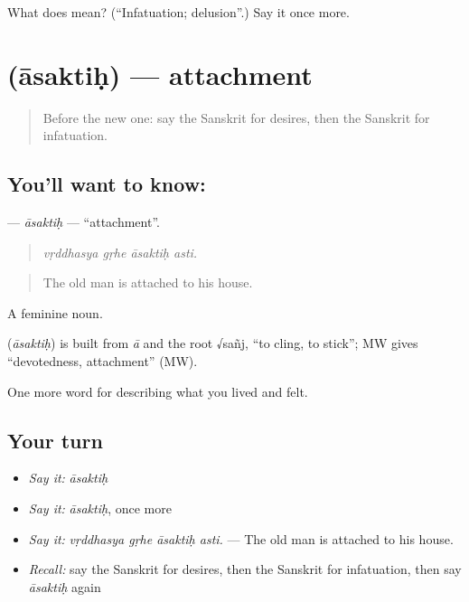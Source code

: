\begin{tcolorbox}[breakable,colback=teal!4,colframe=teal!35!black,title={Before you move on}]
What does  mean? (\textquotedblleft{}Infatuation; delusion\textquotedblright{}.) Say it once more.
\end{tcolorbox}
\section[\texorpdfstring{\sk{आसक्तिः} (āsaktiḥ)}{आसक्तिः (āsaktiḥ)}]{ (āsaktiḥ) — attachment}

\label{lesson:SA-C455-asaktih}



\begin{quote}
Before the new one: say the Sanskrit for desires, then the Sanskrit for infatuation.
\end{quote}

\subsection*{You'll want to know: }
\textbf{} — \emph{āsaktiḥ} — \textquotedblleft{}attachment\textquotedblright{}.

\begin{quote}
   
\end{quote}

\begin{quote}
\emph{vṛddhasya gṛhe āsaktiḥ asti.}
\end{quote}

\begin{quote}
The old man is attached to his house.
\end{quote}

A feminine noun.

\begin{cousinweb}
\textbf{} (\emph{āsaktiḥ}) is built from \emph{ā} and the root √sañj, \textquotedblleft{}to cling, to stick\textquotedblright{}; MW gives \textquotedblleft{}devotedness, attachment\textquotedblright{} (MW).
\end{cousinweb}

\begin{grammarlens}[title={What you've built}]
One more word for describing what you lived and felt.
\end{grammarlens}

\subsection*{Your turn}
\begin{itemize}
\raggedright
  \item \emph{Say it:} \emph{āsaktiḥ}
  \item \emph{Say it:} \emph{āsaktiḥ}, once more
  \item \emph{Say it:} \emph{vṛddhasya gṛhe āsaktiḥ asti.} — The old man is attached to his house.
  \item \emph{Recall:} say the Sanskrit for desires, then the Sanskrit for infatuation, then say \emph{āsaktiḥ} again
\end{itemize}

